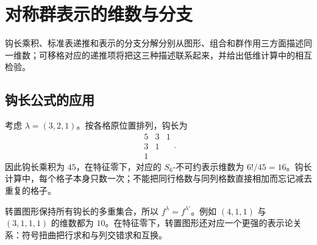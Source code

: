 \section{对称群表示的维数与分支}
\label{b5:sec:0606}

钩长乘积、标准表递推和表示的分支分解分别从图形、组合和群作用三方面描述同一维数；可移格对应的递推项将把这三种描述联系起来，并给出低维计算中的相互检验。

\subsection{钩长公式的应用}
\label{b5:subsec:0606:01}

考虑 \(\lambda=(3,2,1)\)。按各格原位置排列，钩长为
\[
	\begin{array}{ccc}
		5&3&1\\
		3&1&\\
		1&&
	\end{array}.
\]
因此钩长乘积为 \(45\)，在特征零下，对应的 \(S_6\)-不可约表示维数为 \(6!/45=16\)。钩长计算中，每个格子本身只数一次；不能把同行格数与同列格数直接相加而忘记减去重复的格子。

\ProseParagraphBreak

转置图形保持所有钩长的多重集合，所以 \(f^\lambda=f^{\lambda'}\)。例如 \((4,1,1)\) 与 \((3,1,1,1)\) 的维数都为 \(10\)。在特征零下，转置图形还对应一个更强的表示论关系：符号扭曲把行求和与列交错求和互换。

